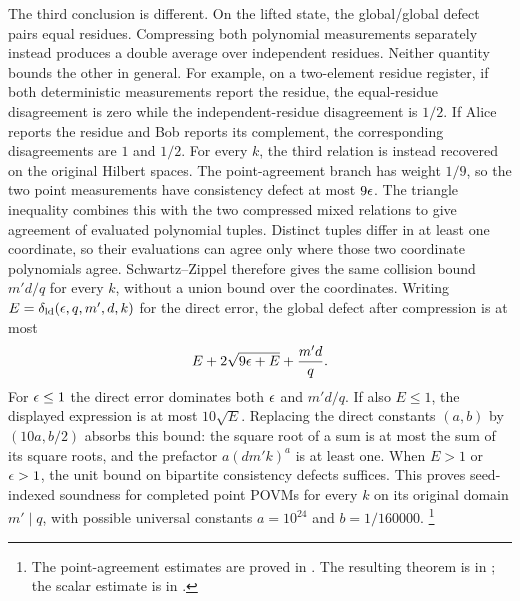 \documentclass[11pt]{article}
\begin{document}
The third conclusion is different.  On the lifted state, the
global/global defect pairs equal residues.  Compressing both polynomial
measurements separately instead produces a double average over independent
residues.  Neither quantity bounds the other in general.  For example, on a
two-element residue register, if both deterministic measurements report the
residue, the equal-residue disagreement is zero while the independent-residue
disagreement is $1/2$.  If Alice reports the residue and Bob reports its
complement, the corresponding disagreements are $1$ and $1/2$. For every $k$,
the third relation is instead recovered on the original Hilbert spaces.
The point-agreement branch has weight $1/9$, so the two point measurements
have consistency defect at most $9\epsilon$. The triangle inequality combines
this with the two compressed mixed relations to give agreement of evaluated
polynomial tuples. Distinct tuples differ in at least one coordinate, so
their evaluations can agree only where those two coordinate polynomials
agree. Schwartz--Zippel therefore gives the same collision bound $m'd/q$
for every $k$, without a union bound over the coordinates.
Writing $E=\delta_{\mathrm{ld}}(\epsilon,q,m',d,k)$ for the direct error, the
global defect after compression is at most
\[
  E+2\sqrt{9\epsilon+E}+\frac{m'd}{q}.
\]
For $\epsilon\leq1$ the direct error dominates both $\epsilon$ and $m'd/q$.
If also $E\leq1$, the displayed expression is at most $10\sqrt E$.
Replacing the direct constants $(a,b)$ by $(10a,b/2)$ absorbs this bound:
the square root of a sum is at most the sum of its square roots, and the
prefactor $a(dm'k)^a$ is at least one. When $E>1$ or $\epsilon>1$, the unit
bound on bipartite consistency defects suffices. This proves seed-indexed
soundness for completed point POVMs for every $k$ on its original domain
$m'\mid q$, with possible
universal constants $a=10^{24}$ and $b=1/160000$.%
\footnote{The point-agreement estimates are proved in
.
The resulting theorem is  in
; the scalar estimate is
 in
.}
\end{document}
